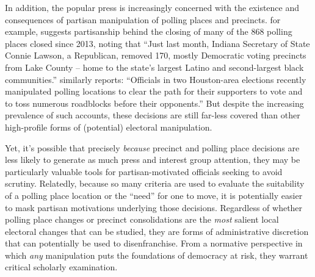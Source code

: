 \documentclass[12pt]{article}
\begin{document}
In addition, the popular press is increasingly concerned with the existence and consequences of partisan manipulation of polling places and precincts.  \cite{Vasilogambros:2018wu} for example, suggests partisanship behind the closing of many of the 868 polling places closed since 2013, noting that ``Just last month, Indiana Secretary of State Connie Lawson, a Republican, removed 170, mostly Democratic voting precincts from Lake County -- home to the state's largest Latino and second-largest black communities.'' \cite{plainview} similarly reports: ``Officials in two Houston-area elections recently manipulated polling locations to clear the path for their supporters to vote and to toss numerous roadblocks before their opponents.''  But despite the increasing prevalence of such accounts, these decisions are still far-less covered than other high-profile forms of (potential) electoral manipulation.

Yet, it's possible that precisely \emph{because} precinct and polling place decisions are less likely to generate as much press and interest group attention, they may be particularly valuable tools for partisan-motivated officials seeking to avoid scrutiny. Relatedly, because so many criteria are used to evaluate the suitability of a polling place location or the ``need'' for one to move, it is potentially easier to mask partisan motivations underlying those decisions.  Regardless of whether polling place changes or precinct consolidations are the \emph{most} salient local electoral changes that can be studied, they are forms of administrative discretion that can potentially be used to disenfranchise.  From a normative perspective in which \emph{any} manipulation puts the foundations of democracy at risk, they warrant critical scholarly examination.

\end{document}
